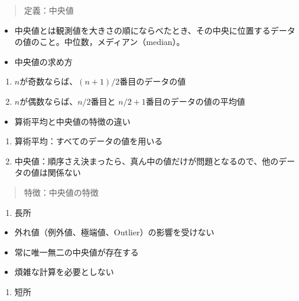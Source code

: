 \documentclass[
]{book}
\providecommand{\tightlist}{%
  \setlength{\itemsep}{0pt}\setlength{\parskip}{0pt}}
\theoremstyle{definition}
\theoremstyle{definition}
\theoremstyle{definition}
\theoremstyle{definition}
\theoremstyle{remark}
\begin{document}
\begin{quote}
定義：中央値
\end{quote}

\begin{itemize}
\item
  中央値とは観測値を大きさの順にならべたとき、その中央に位置するデータの値のこと。中位数，メディアン（median）。
\item
  中央値の求め方
\end{itemize}

\begin{enumerate}
\def\labelenumi{\arabic{enumi}.}
\tightlist
\item
  \(n\)が奇数ならば、\((n+1)/2\)番目のデータの値
\item
  \(n\)が偶数ならば、\(n/2\)番目と \(n/2+1\)番目のデータの値の平均値
\end{enumerate}

\begin{itemize}
\tightlist
\item
  算術平均と中央値の特徴の違い
\end{itemize}

\begin{enumerate}
\def\labelenumi{\arabic{enumi}.}
\tightlist
\item
  算術平均：すべてのデータの値を用いる
\item
  中央値：順序さえ決まったら、真ん中の値だけが問題となるので、他のデータの値は関係ない
\end{enumerate}

\begin{quote}
特徴：中央値の特徴
\end{quote}

\begin{enumerate}
\def\labelenumi{\arabic{enumi}.}
\tightlist
\item
  長所
\end{enumerate}

\begin{itemize}
\tightlist
\item
  外れ値（例外値、極端値、Outlier）の影響を受けない
\item
  常に唯一無二の中央値が存在する
\item
  煩雑な計算を必要としない
\end{itemize}

\begin{enumerate}
\def\labelenumi{\arabic{enumi}.}
\setcounter{enumi}{1}
\tightlist
\item
  短所
\end{enumerate}
\end{document}
